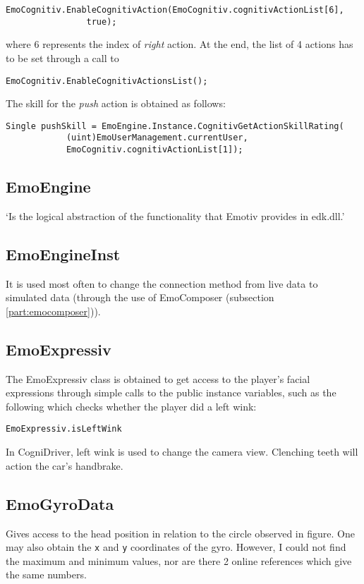 \begin{Verbatim}[frame=single, framesep=3mm]
EmoCognitiv.EnableCognitivAction(EmoCognitiv.cognitivActionList[6], 
				true);
\end{Verbatim}
		
where 6 represents the index of \textit{right} action. At the end, the list of 4 actions has to be set through a call to 

\begin{Verbatim}[frame=single, framesep=3mm]
EmoCognitiv.EnableCognitivActionsList();
\end{Verbatim}

The skill for the \textit{push} action is obtained as follows:

\begin{Verbatim}[frame=single, framesep=3mm]
Single pushSkill = EmoEngine.Instance.CognitivGetActionSkillRating(
			(uint)EmoUserManagement.currentUser,
			EmoCognitiv.cognitivActionList[1]); 
\end{Verbatim}

\subsection{EmoEngine}
`Is the logical abstraction of the functionality that Emotiv provides in edk.dll.'\cite{emotivSDKUserManual}

\subsection{EmoEngineInst}
It is used most often to change the connection method from live data to simulated data (through the use of EmoComposer (subsection \ref{part:emocomposer})).

\subsection{EmoExpressiv}
The EmoExpressiv class is obtained to get access to the player's facial expressions through simple calls to the public instance variables, such as the following which checks whether the player did a left wink:

\begin{Verbatim}[frame=single, framesep=3mm]
EmoExpressiv.isLeftWink
\end{Verbatim}

In CogniDriver, left wink is used to change the camera view. Clenching teeth will action the car's handbrake. 

\subsection{EmoGyroData}
Gives access to the head position in relation to the circle observed in figure. One may also obtain the \texttt{x} and \texttt{y} coordinates of the gyro. However, I could not find the maximum and minimum values, nor are there 2 online references which give the same numbers.

